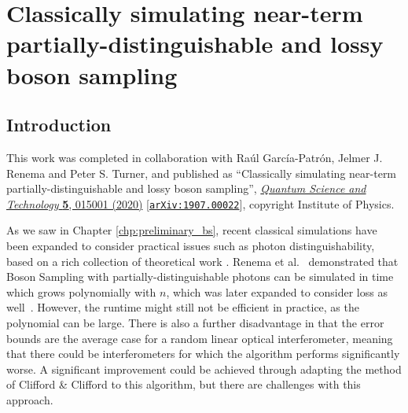 \chapter{Classically simulating near-term partially-distinguishable and lossy boson sampling}
\label{chp:classical_sim}

\section{Introduction}

This work was completed in collaboration with Ra\'ul Garc\'ia-Patr\'on, Jelmer J. Renema and Peter S. Turner, and published as ``Classically simulating near-term partially-distinguishable and lossy boson sampling'', \href{https://iopscience.iop.org/article/10.1088/2058-9565/ab5555}{\textit{Quantum Science and Technology} \textbf{5}, 015001 (2020)} [{\tt \href{https://arxiv.org/abs/1907.00022}{arXiv:1907.00022}}], copyright Institute of Physics.

As we saw in Chapter \ref{chp:preliminary_bs}, recent classical simulations have been expanded to consider practical issues such as photon distinguishability, based on a rich collection of theoretical work \cite{deguise2014, tamma2014, shchesnovich2014, rohde2015, shchesnovich2015, tichy2015, tillmann2015}. 
Renema et al.~\cite{renema2018} demonstrated that Boson Sampling with partially-distinguishable photons can be simulated in time which grows polynomially with $n$, which was later expanded to consider loss as well~\cite{renema2018loss}. 
However, the runtime might still not be efficient in practice, as the polynomial can be large. There is also a further disadvantage in that the error bounds are the average case for a random linear optical interferometer, meaning that there could be interferometers for which the algorithm performs significantly worse.
A significant improvement could be achieved through adapting the method of Clifford \& Clifford to this algorithm, but there are challenges with this approach.

